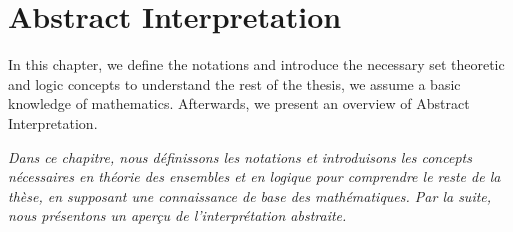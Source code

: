 


\setchapterpreamble[u]{\margintoc}


\chapter{Abstract Interpretation}


\marginemptybox{11.1cm}

In this chapter, we define the notations and introduce the necessary set theoretic and logic concepts to understand the rest of the thesis, we assume a basic knowledge of mathematics.
Afterwards, we present an overview of Abstract Interpretation.

\frenchdiv

\emph{Dans ce chapitre, nous définissons les notations et introduisons les concepts nécessaires en théorie des ensembles et en logique pour comprendre le reste de la thèse, en supposant une connaissance de base des mathématiques. Par la suite, nous présentons un aperçu de l'interprétation abstraite.}

